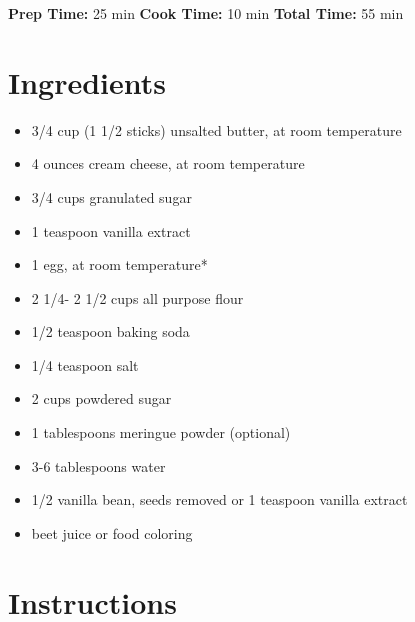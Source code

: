 \documentclass[
  letterpaper,
  DIV=11,
  numbers=noendperiod,
  titlepage=false]{scrreprt}
\providecommand{\tightlist}{%
  \setlength{\itemsep}{0pt}\setlength{\parskip}{0pt}}\usepackage{longtable,booktabs,array}
\begin{document}
\textbf{Prep Time:} 25 min \textbar{} \textbf{Cook Time:} 10 min
\textbar{} \textbf{Total Time:} 55 min

\section{Ingredients}\label{ingredients-139}

\begin{itemize}
\tightlist
\item
  3/4 cup (1 1/2 sticks) unsalted butter, at room temperature
\item
  4 ounces cream cheese, at room temperature
\item
  3/4 cups granulated sugar
\item
  1 teaspoon vanilla extract
\item
  1 egg, at room temperature*
\item
  2 1/4- 2 1/2 cups all purpose flour
\item
  1/2 teaspoon baking soda
\item
  1/4 teaspoon salt
\item
  2 cups powdered sugar
\item
  1 tablespoons meringue powder (optional)
\item
  3-6 tablespoons water
\item
  1/2 vanilla bean, seeds removed or 1 teaspoon vanilla extract
\item
  beet juice or food coloring
\end{itemize}

\section{Instructions}\label{instructions-139}
\end{document}
